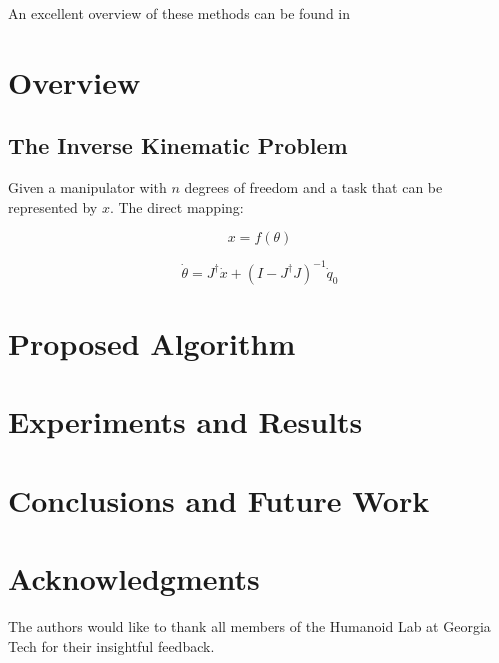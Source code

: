 \documentclass[conference]{IEEEtran}
\newcommand{\Jps}{ \ensuremath{J^{\dagger}} }
\newcommand{\dx}{ \ensuremath{\dot{x}} }
\newcommand{\dt}{ \ensuremath{\dot{\theta}} }
\begin{document}
An excellent overview of these methods can be found in \cite{siciliano-ns-1990}

\section{Overview}
\label{sec:Overview}

\subsection{The Inverse Kinematic Problem}
Given a manipulator with $n$ degrees of freedom and a task that
can be represented by $x$. The direct mapping:

\begin{equation}
x = f(\theta) 
\label{eq:DK}
\end{equation}

\begin{equation}
\dt = \Jps \dx + (I - \Jps J)^{-1}\dot{q}_{0}
\label{eq:IK_MinNorm_Solution}
\end{equation}



\section{Proposed Algorithm}
\label{sec:ProposedAlgorithm}


\section{Experiments and Results}
\label{sec:Experiments}


\section{Conclusions and Future Work}
\label{sec:Conclusions}


\section*{Acknowledgments}
The authors would like to thank all members of the Humanoid Lab
at Georgia Tech for their insightful feedback.



\end{document}

